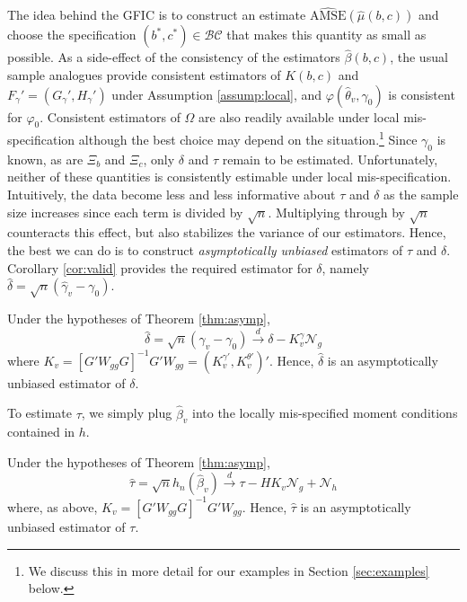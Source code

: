 The idea behind the GFIC is to construct an estimate $\widehat{\mbox{AMSE}}\left(\widehat{\mu}(b,c)\right)$ and choose the specification $(b^*,c^*)\in\mathcal{BC}$ that makes this quantity as small as possible. 
As a side-effect of the consistency of the estimators $\widehat{\beta}(b,c)$, the usual sample analogues provide consistent estimators of $K(b,c)$ and $F_{\gamma}' = (G_\gamma', H_\gamma')$ under Assumption \ref{assump:local}, and $\varphi(\widehat{\theta}_v,\gamma_0)$ is consistent for $\varphi_0$. 
Consistent estimators of $\Omega$ are also readily available under local mis-specification although the best choice may depend on the situation.\footnote{We discuss this in more detail for our examples in Section \ref{sec:examples} below.}
Since $\gamma_0$ is known, as are $\Xi_b$ and $\Xi_c$, only $\delta$ and $\tau$ remain to be estimated. 
Unfortunately, neither of these quantities is consistently estimable under local mis-specification. 
Intuitively, the data become less and less informative about $\tau$ and $\delta$ as the sample size increases since each term is divided by $\sqrt{n}$. 
Multiplying through by $\sqrt{n}$ counteracts this effect, but also stabilizes the variance of our estimators. 
Hence, the best we can do is to construct \emph{asymptotically unbiased} estimators of $\tau$ and $\delta$. 
Corollary \ref{cor:valid} provides the required estimator for $\delta$, namely $\widehat{\delta} = \sqrt{n}\left(\widehat{\gamma}_v - \gamma_0\right)$.

\begin{cor} 
\label{cor:deltahat}
Under the hypotheses of Theorem \ref{thm:asymp},
	$$\widehat{\delta} = \sqrt{n}\left(\widehat{\gamma}_v - \gamma_0\right) \overset{d}{\rightarrow} \delta - K_{v}^{\gamma} \mathscr{N}_g$$
where $K_v = \left[G'W_{gg}G\right]^{-1}G'W_{gg} = \left(K_{v}^{\gamma '}, K_{v}^{\theta '}\right)'$. Hence, $\widehat{\delta}$ is an asymptotically unbiased estimator of $\delta$.
\end{cor} 

To estimate $\tau$, we simply plug $\widehat{\beta}_v$ into the locally mis-specified moment conditions contained in $h$.

\begin{lem}
\label{lem:tauhatasymp}
Under the hypotheses of Theorem \ref{thm:asymp},
	$$\widehat{\tau} = \sqrt{n}h_n\left(\widehat{\beta}_v\right) \overset{d}{\rightarrow} \tau - HK_v \mathscr{N}_g + \mathscr{N}_h$$
where, as above, $K_v = \left[G'W_{gg}G\right]^{-1}G'W_{gg}$. Hence, $\widehat{\tau}$ is an asymptotically unbiased estimator of $\tau$.
\end{lem}

